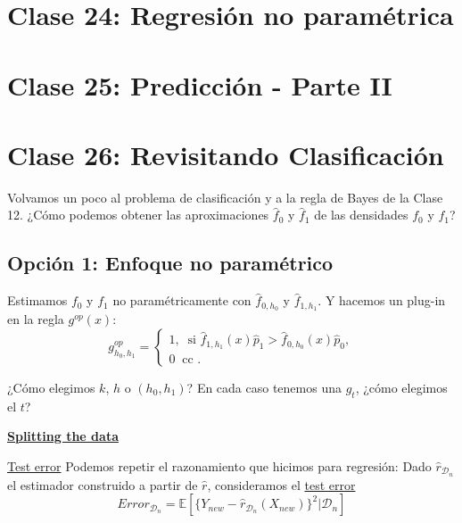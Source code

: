 \documentclass[a4paper,12pt]{article}
\theoremstyle{definition}
\numberwithin{prop}{section}
\theoremstyle{remark}
\numberwithin{ej_subseccion}{subsection}
\begin{document}
	\section*{Clase 24: Regresión no paramétrica}
	\section*{Clase 25: Predicción - Parte II}
	
	\section*{Clase 26: Revisitando Clasificación}
	Volvamos un poco al problema de clasificación y a la regla de Bayes de la Clase 12. ¿Cómo podemos obtener las aproximaciones $\hat{f}_0$ y $\hat{f}_1$ de las densidades $f_0$ y $f_1$?
	
	\subsection*{Opción 1: Enfoque no paramétrico}
	Estimamos $f_0$ y $f_1$ no paramétricamente con $\hat{f}_{0,h_0}$ y $\hat{f}_{1,h_1}$. Y hacemos un plug-in en la regla $g^{op}(x)$:
	$$g^{op}_{h_0,h_1}=
	\begin{cases}
		1, \ \text{ si } \hat{f}_{1,h_1}(x)\hat{p}_1>\hat{f}_{0,h_0}(x)\hat{p}_0, \\
		0 \ \text{ cc }.		
	\end{cases}$$
	
	¿Cómo elegimos $k$, $h$ o $(h_0,h_1)$? En cada caso tenemos una $\hat{g}_t$, ¿cómo elegimos el $t$?
	
	\underline{\textbf{Splitting the data}}
	
	\underline{Test error} Podemos repetir el razonamiento que hicimos para regresión:
	Dado $\hat{r}_{\mathcal{D}_n}$ el estimador construido a partir de $\hat{r}$, consideramos el \underline{test error}
	$$Error_{\mathcal{D}_n}=\mathbb{E}[\{Y_{new}-\hat{r}_{\mathcal{D}_n}(X_{new})\}^2|\mathcal{D}_n]$$
	
\end{document}
